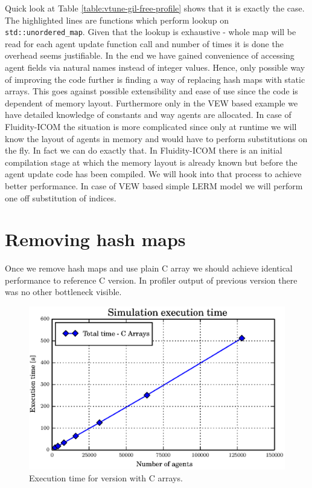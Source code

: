 \documentclass[12pt, a4paper]{report}
\begin{document}
Quick look at Table \ref{table:vtune-gil-free-profile} shows that it is exactly the case.
The highlighted lines are functions which perform lookup on \lstinline{std::unordered_map}.
Given that the lookup is exhaustive - whole map will be read for each agent update function
call and number of times it is done the overhead seems justifiable. In the end we have
gained convenience of accessing agent fields via natural names instead of integer values.
Hence, only possible way of improving the code further is finding a way of replacing
hash maps with static arrays. This goes against possible extensibility and ease of use since
the code is dependent of memory layout. Furthermore only in the VEW based example we have
detailed knowledge of constants and way agents are allocated. In case of Fluidity-ICOM
the situation is more complicated since only at runtime we will know the layout of agents
in memory and would have to perform substitutions on the fly. In fact we can do exactly that.
In Fluidity-ICOM there is an initial compilation stage at which the memory layout is already
known but before the agent update code has been compiled. We will hook into that process
to achieve better performance. In case of VEW based simple LERM model we will perform one
off substitution of indices.

\section{Removing hash maps}\label{sec:remove-dict}
Once we remove hash maps and use plain C array we should achieve identical performance
to reference C version. In profiler output of previous version there was no other bottleneck
visible.

\begin{figure}[H]
  \begin{center}
    \includegraphics[width=\columnwidth]{graphs/dict-array-perf.eps}
    \caption{Execution time for version with C arrays.}
    \label{fig:dict-array-perf}
  \end{center}
\end{figure}
\end{document}
